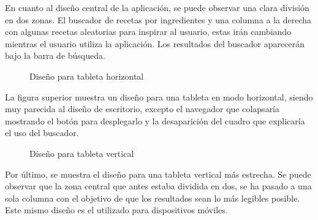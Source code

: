 En cuanto al diseño central de la aplicación, se puede observar una clara división en dos zonas. El buscador de recetas por ingredientes y una columna a la derecha con algunas recetas aleatorias para inspirar al usuario, estas irán cambiando mientras el usuario utiliza la aplicación. Los resultados del buscador aparecerán bajo la barra de búsqueda.
\newpage
\begin{figure}[h!]
\centering
{}
\caption{Diseño para tableta horizontal}
\label{fig:surface}
\end{figure}
La figura superior muestra un diseño para una tableta en modo horizontal, siendo muy parecida al diseño de escritorio, excepto el navegador que colapsaría mostrando el botón para desplegarlo y la desaparición del cuadro que explicaría el uso del buscador.

\begin{figure}[b!p]
\centering
{}
\caption{Diseño para tableta vertical}
\label{fig:ipad}
\end{figure}
Por último, se muestra el diseño para una tableta vertical más estrecha. Se puede observar que la zona central que antes estaba dividida en dos, se ha pasado a una sola columna con el objetivo de que los resultados sean lo más legibles posible. Este mismo diseño es el utilizado para dispositivos móviles.

